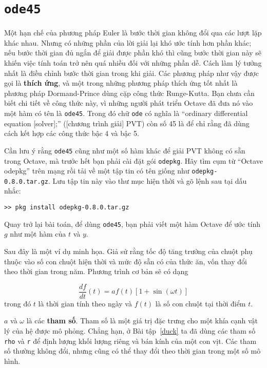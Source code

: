 \documentclass[12pt]{book}
\begin{document}
\section{{\tt ode45}}
\label{ode45}

Một hạn chế của phương pháp Euler là bước thời gian không đổi qua
các lượt lặp khác nhau. Nhưng có những phần của lời giải lại khó
ước tính hơn phần khác; nếu bước thời gian đủ ngắn để giải được
phần khó thì cũng bước thời gian này sẽ khiến việc tính toán trở nên
quá nhiều đối với những phần dễ. Cách làm lý tưởng nhất là điều 
chỉnh bước thời gian trong khi giải. Các phương pháp như vậy được
gọi là {\bf thích ứng}, và một trong những phương pháp thích ứng
tốt nhất là phương pháp Dormand-Prince dùng cặp công thức 
Runge-Kutta. Bạn chưa cần biết chi tiết về công thức này, vì những
người phát triển Octave đã đưa nó vào một hàm có tên là 
{\tt ode45}.  Trong đó chữ {\tt ode} có nghĩa là ``ordinary differential
equation [solver];'' ([chương trình giải] PVT) còn số 45 là để chỉ
rằng đã dùng cách kết hợp các công thức bậc 4 và bậc 5.

Cần lưu ý rằng {\tt ode45} cũng như một số hàm khác để giải PVT 
không có sẵn trong Octave, mà trước hết bạn phải cài đặt gói 
\texttt{odepkg}. Hãy tìm cụm từ ``Octave odepkg'' trên mạng 
rồi tải về một tập tin có tên giống như \texttt{odepkg-0.8.0.tar.gz}.
Lưu tập tin này vào thư mục hiện thời và gõ lệnh sau tại dấu nhắc:

\begin{verbatim}
>> pkg install odepkg-0.8.0.tar.gz
\end{verbatim}

Quay trở lại bài toán, để dùng {\tt ode45}, bạn phải viết một hàm Octave để ước tính
$g$ như một hàm của $t$ và $y$.


Sau đây là một ví dụ minh họa. Giả sử rằng tốc độ tăng trưởng của
chuột phụ thuộc vào số con chuột hiện thời và mức độ sẵn có của
thức ăn, vốn thay đổi theo thời gian trong năm.
Phương trình cơ bản sẽ có dạng

\[ \frac{df}{dt}(t) = a f(t) \left[1 + \sin (\omega t) \right] \]
%
trong đó $t$ là thời gian tính theo ngày và $f(t)$ là 
số con chuột tại thời điểm $t$.

$a$ và $\omega$ là các {\bf tham số}. Tham số là một giá trị 
đặc trưng cho một khía cạnh vật lý của hệ được mô phỏng. 
Chẳng hạn, ở Bài tập~\ref{duck} ta đã dùng các tham số {\tt rho} 
và {\tt r} để định lượng khối lượng riêng và bán kính của một
con vịt. Các tham số thường không đổi, nhưng cũng có thể
thay đổi theo thời gian trong một số mô hình.
\end{document}
